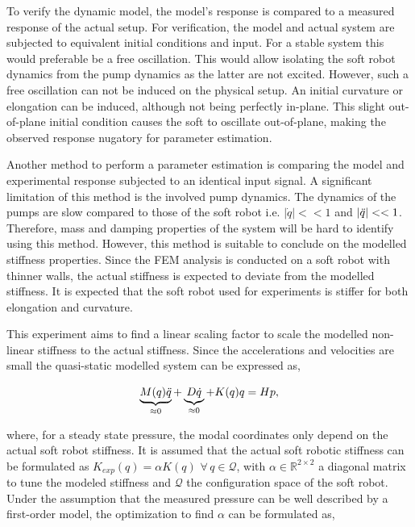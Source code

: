 To verify the dynamic model, the model's response is compared to a measured response of the actual setup. For verification, the model and actual system are subjected to equivalent initial conditions and input. For a stable system this would preferable be a free oscillation. This would allow isolating the soft robot dynamics from the pump dynamics as the latter are not excited. However, such a free oscillation can not be induced on the physical setup. An initial curvature or elongation can be induced, although not being perfectly in-plane. This slight out-of-plane initial condition causes the soft to oscillate out-of-plane, making the observed response nugatory for parameter estimation.


Another method to perform a parameter estimation is comparing the model and experimental response subjected to an identical input signal. A significant limitation of this method is the involved pump dynamics. The dynamics of the pumps are slow compared to those of the soft robot i.e. $|\dot{q}|<< 1$ and $|\Ddot{q}|<< 1 $. Therefore, mass and damping properties of the system will be hard to identify using this method. However, this method is suitable to conclude on the modelled stiffness properties. Since the FEM analysis is conducted on a soft robot with thinner walls, the actual stiffness is expected to deviate from the modelled stiffness. It is expected that the soft robot used for experiments is stiffer for both elongation and curvature. 

This experiment aims to find a linear scaling factor to scale the modelled non-linear stiffness to the actual stiffness. Since the accelerations and velocities are small the quasi-static modelled system can be expressed as,

\begin{equation}
   \underbrace{M(q) \Ddot{q}}_{\approx 0} + \underbrace{D \dot{q}}_{\approx 0} + K(q) q = Hp,
\end{equation}

where, for a steady state pressure, the modal coordinates only depend on the actual soft robot stiffness. It is assumed that the actual soft robotic stiffness can be formulated as $K_{exp}(q) = \alpha K(q) \hspace{4pt} \forall \hspace{2pt} q \in \mathcal{Q}$, with $\alpha \in \mathbb{R}^{2\times 2}$ a diagonal matrix to tune the modeled stiffness and $\mathcal{Q}$ the configuration space of the soft robot. Under the assumption that the measured pressure can be well described by a first-order model, the optimization to find $\alpha$ can be formulated as, 


